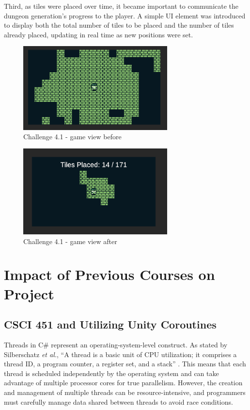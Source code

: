 \documentclass[a4paper, 12pt, one column, aas_macros]{article}
\begin{document}
Third, as tiles were placed over time, it became important to communicate the dungeon generation’s progress to the player. A simple UI element was introduced to display both the total number of tiles to be placed and the number of tiles already placed, updating in real time as new positions were set.

\begin{figure}[htbp]
  \centering
  \includegraphics[width=0.7\textwidth]{images/difficulty-1-before.png}
  \caption{Challenge 4.1 - game view before}
  \label{fig:difficulty-1-before}
\end{figure}

\begin{figure}[htbp]
  \centering
  \includegraphics[width=0.7\textwidth]{images/difficulty-1-after.png}
  \caption{Challenge 4.1 - game view after}
  \label{fig:difficulty-1-after}
\end{figure}

\section{Impact of Previous Courses on Project}
\subsection{CSCI 451 and Utilizing Unity Coroutines}
Threads in C\# represent an operating-system-level construct. As stated by Silberschatz \emph{et al.}, ``A thread is a basic unit of CPU utilization; it comprises a thread ID, a program counter, a register set, and a stack'' \cite{silberschatz}. This means that each thread is scheduled independently by the operating system and can take advantage of multiple processor cores for true parallelism. However, the creation and management of multiple threads can be resource-intensive, and programmers must carefully manage data shared between threads to avoid race conditions. 
\end{document}
